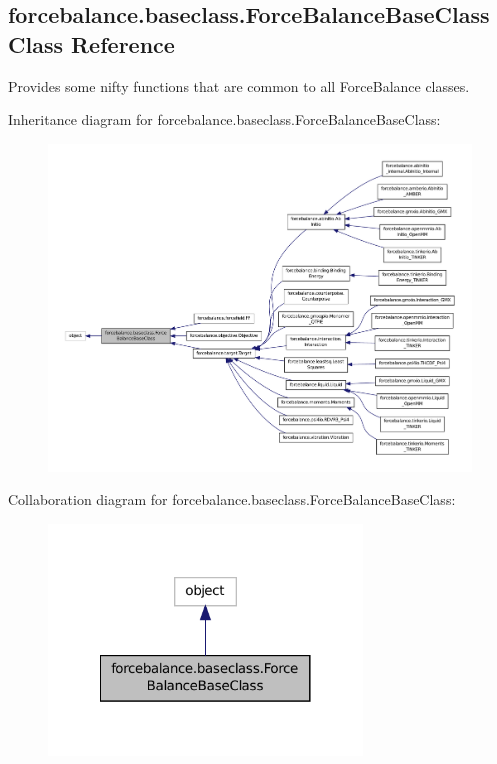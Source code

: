 \hypertarget{classforcebalance_1_1baseclass_1_1ForceBalanceBaseClass}{\subsection{forcebalance.\-baseclass.\-Force\-Balance\-Base\-Class Class Reference}
\label{classforcebalance_1_1baseclass_1_1ForceBalanceBaseClass}
}


Provides some nifty functions that are common to all Force\-Balance classes.  




Inheritance diagram for forcebalance.\-baseclass.\-Force\-Balance\-Base\-Class\-:\nopagebreak
\begin{figure}[H]
\begin{center}
\leavevmode
\includegraphics[width=350pt]{classforcebalance_1_1baseclass_1_1ForceBalanceBaseClass__inherit__graph}
\end{center}
\end{figure}


Collaboration diagram for forcebalance.\-baseclass.\-Force\-Balance\-Base\-Class\-:\nopagebreak
\begin{figure}[H]
\begin{center}
\leavevmode
\includegraphics[width=236pt]{classforcebalance_1_1baseclass_1_1ForceBalanceBaseClass__coll__graph}
\end{center}
\end{figure}
